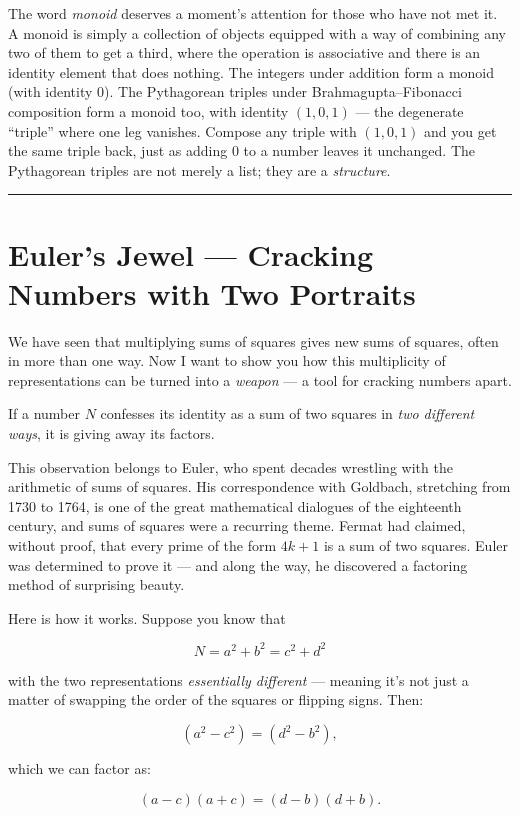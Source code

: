 The word \emph{monoid} deserves a moment's attention for those who have not met it. A monoid is simply a collection of objects equipped with a way of combining any two of them to get a third, where the operation is associative and there is an identity element that does nothing. The integers under addition form a monoid (with identity \(0\)). The Pythagorean triples under Brahmagupta--Fibonacci composition form a monoid too, with identity \((1, 0, 1)\) --- the degenerate ``triple'' where one leg vanishes. Compose any triple with \((1, 0, 1)\) and you get the same triple back, just as adding \(0\) to a number leaves it unchanged. The Pythagorean triples are not merely a list; they are a \emph{structure}.

\bigskip\noindent\rule{\linewidth}{0.4pt}\bigskip

\section{Euler's Jewel --- Cracking Numbers with Two Portraits}
We have seen that multiplying sums of squares gives new sums of squares, often in more than one way. Now I want to show you how this multiplicity of representations can be turned into a \emph{weapon} --- a tool for cracking numbers apart.

If a number \(N\) confesses its identity as a sum of two squares in \emph{two different ways}, it is giving away its factors.

This observation belongs to Euler, who spent decades wrestling with the arithmetic of sums of squares. His correspondence with Goldbach, stretching from 1730 to 1764, is one of the great mathematical dialogues of the eighteenth century, and sums of squares were a recurring theme. Fermat had claimed, without proof, that every prime of the form \(4k + 1\) is a sum of two squares. Euler was determined to prove it --- and along the way, he discovered a factoring method of surprising beauty.

Here is how it works. Suppose you know that

\[N = a^2 + b^2 = c^2 + d^2\]

with the two representations \emph{essentially different} --- meaning it's not just a matter of swapping the order of the squares or flipping signs. Then:

\[(a^2 - c^2) = (d^2 - b^2),\]

which we can factor as:

\[(a - c)(a + c) = (d - b)(d + b).\]

